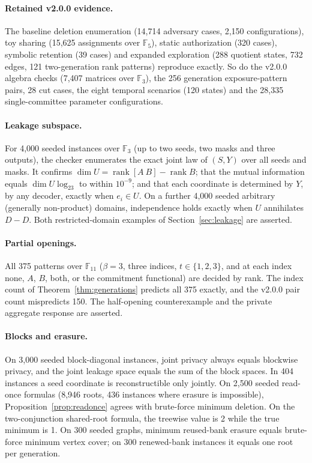 \documentclass[pdflatex,sn-mathphys-num]{sn-jnl}
\theoremstyle{plain}
\theoremstyle{definition}
\newcommand{\F}{\mathbb{F}}
\newcommand{\rk}{\operatorname{rank}}
\begin{document}
\paragraph{Retained v2.0.0 evidence.}
The baseline deletion enumeration (14,714 adversary cases, 2,150 configurations), toy sharing (15,625 assignments over $\F_5$), static authorization (320 cases), symbolic retention (39 cases) and expanded exploration (288 quotient states, 732 edges, 121 two-generation rank patterns) reproduce exactly. So do the v2.0.0 algebra checks (7,407 matrices over $\F_3$), the 256 generation exposure-pattern pairs, 28 cut cases, the eight temporal scenarios (120 states) and the 28,335 single-committee parameter configurations.

\paragraph{Leakage subspace.}
For 4,000 seeded instances over $\F_3$ (up to two seeds, two masks and three outputs), the checker enumerates the exact joint law of $(S,Y)$ over all seeds and masks. It confirms $\dim U=\rk[A\ B]-\rk B$; that the mutual information equals $\dim U\log_23$ to within $10^{-9}$; and that each coordinate is determined by $Y$, by any decoder, exactly when $e_i\in U$. On a further 4,000 seeded arbitrary (generally non-product) domains, independence holds exactly when $U$ annihilates $D-D$. Both restricted-domain examples of Section~\ref{sec:leakage} are asserted.

\paragraph{Partial openings.}
All 375 patterns over $\F_{11}$ ($\beta=3$, three indices, $t\in\{1,2,3\}$, and at each index none, $A$, $B$, both, or the commitment functional) are decided by rank. The index count of Theorem~\ref{thm:generations} predicts all 375 exactly, and the v2.0.0 pair count mispredicts 150. The half-opening counterexample and the private aggregate response are asserted.

\paragraph{Blocks and erasure.}
On 3,000 seeded block-diagonal instances, joint privacy always equals blockwise privacy, and the joint leakage space equals the sum of the block spaces. In 404 instances a seed coordinate is reconstructible only jointly. On 2,500 seeded read-once formulas (8,946 roots, 436 instances where erasure is impossible), Proposition~\ref{prop:readonce} agrees with brute-force minimum deletion. On the two-conjunction shared-root formula, the treewise value is 2 while the true minimum is 1. On 300 seeded graphs, minimum reused-bank erasure equals brute-force minimum vertex cover; on 300 renewed-bank instances it equals one root per generation.
\end{document}
